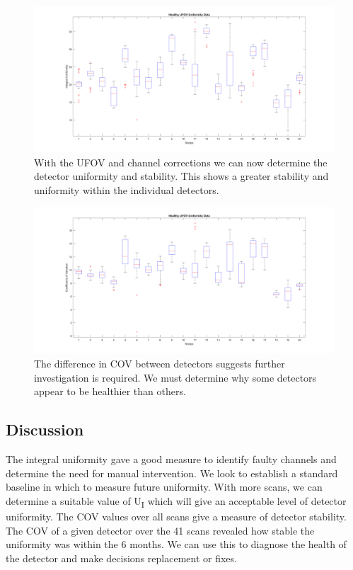 \begin{figure}[!t]
\centering
\includegraphics[width=5.6in]{figures/FixUFOVUBox.png}

    \caption{With the \acrshort{UFOV} and channel corrections we can now determine the detector uniformity and stability. This shows a greater stability and uniformity within the individual detectors.} \label{fig:healthUFOVU}
\end{figure}

\begin{figure}[!t]
\centering
\includegraphics[width=5.6in]{figures/FixUFOVCOVBox.png}

    \caption{The difference in \acrshort{COV} between detectors suggests further investigation is required. We must determine why some detectors appear to be healthier than others.} \label{fig:healthUFOVCOV}
\end{figure}

\subsection{Discussion}
The integral uniformity gave a good measure to identify faulty channels and determine the need for manual intervention. We look to establish a standard baseline in which to measure future uniformity. With more scans, we can determine a suitable value of U\textsubscript{I} which will give an acceptable level of detector uniformity. The \acrshort{COV} values over all scans give a measure of detector stability. The \acrshort{COV} of a given detector over the 41 scans revealed how stable the uniformity was within the 6 months. We can use this to diagnose the health of the detector and make decisions replacement or fixes. 
